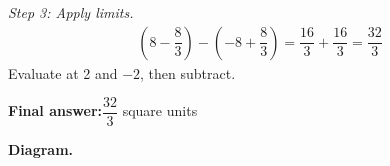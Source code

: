 \documentclass[11pt]{article}
\begin{document}
\textit{Step 3: Apply limits.}
\[\begin{gathered}
\left(8 - \dfrac{8}{3}\right) - \left(-8 + \dfrac{8}{3}\right) = \dfrac{16}{3} + \dfrac{16}{3} = \dfrac{32}{3}
\end{gathered}\]
Evaluate at 2 and \(-2\), then subtract.

\begin{answerbox}
\textbf{Final answer:}\quad \(\displaystyle \dfrac{32}{3}\) square units
\end{answerbox}
\textbf{Diagram.}

\begin{center}
\end{center}
\end{document}
